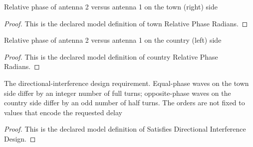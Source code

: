 \begin{definition}
  \label{def:physics:phyx-mini-0187:phyxminiproblems-problemphyxmini0187-townrelativephaseradians}
  Relative phase of antenna 2 versus antenna 1 on the town (right) side
\end{definition}
\begin{proof}
  This is the declared model definition of town Relative Phase Radians.
\end{proof}
\begin{definition}
  \label{def:physics:phyx-mini-0187:phyxminiproblems-problemphyxmini0187-countryrelativephaseradians}
  Relative phase of antenna 2 versus antenna 1 on the country (left) side
\end{definition}
\begin{proof}
  This is the declared model definition of country Relative Phase Radians.
\end{proof}
\begin{definition}
  \label{def:physics:phyx-mini-0187:phyxminiproblems-problemphyxmini0187-satisfiesdirectionalinterferencedesign}
  The directional-interference design requirement. Equal-phase waves on the town side differ by an integer number of full turns; opposite-phase waves on the country side differ by an odd number of half turns. The orders are not fixed to values that encode the requested delay
\end{definition}
\begin{proof}
  This is the declared model definition of Satisfies Directional Interference Design.
\end{proof}
